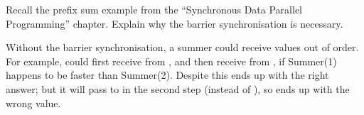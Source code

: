 \begin{question}
Recall the prefix sum example from the ``Synchronous Data Parallel
Programming'' chapter.  Explain why the barrier synchronisation is necessary.
\end{question}


\begin{answer}
Without the barrier synchronisation, a summer could receive values out of
order.  For example,  could first receive 
from , and then receive  from ,
if Summer(1) happens to be faster than Summer(2).  Despite this
 ends up with the right answer; but it will pass
 to  in the second step (instead of
), so  ends up with the wrong value.
\end{answer}
